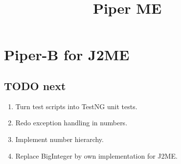 

\newtheorem{atheorem}{Theorem}[section]
\newtheorem{adefinition}{Definition}[section]
\newtheorem{analgo}{Algorithm}[section]
\newtheorem{anexample}{Example}[section]

\newtheorem{acorollary}[atheorem]{Korollar}
\newtheorem{asubtheo}[atheorem]{Lemma}
\newtheorem{atinytheo}[atheorem]{Proposition}
\newcommand{\Path}{{\rm Path}}
\newcommand{\LO}{{\rm LO}}
\newcommand{\Abl}{\mbox{\rm Abl}}
\newcommand{\LAST}{{\rm fin}}
\newcommand{\DIST}{\mbox{\rm DIST}}
\newcommand{\Root}{{\rm root}}
\newcommand{\Front}{\mbox{\rm front}}
\newcommand{\KOST}{{\cal C}}
\newcommand{\Choose}{{\rm Choose}}
\newcommand{\Eword}{\Box}
\newcommand{\Pbegin}{{\rm\bf begin }}
\newcommand{\Pprocedure}{{\rm\bf procedure }}
\newcommand{\Pfunction}{{\rm\bf function }}
\newcommand{\Pinteger}{{\rm\bf integer}}
\newcommand{\Pend}{{\rm\bf end }}
\newcommand{\Pfor}{{\rm\bf for }}
\newcommand{\Pforall}{{\rm\bf for all }}
\newcommand{\Pendfor}{{\rm\bf endfor }}
\newcommand{\Pto}{{\rm\bf to }}
\newcommand{\Pdownto}{{\rm\bf downto }}
\newcommand{\Pdo}{{\rm\bf do }}
\newcommand{\Pif}{{\rm\bf if }}
\newcommand{\Pthen}{{\rm\bf then }}
\newcommand{\Pendif}{{\rm\bf endif }}
\newcommand{\Pelse}{{\rm\bf else }}
\newcommand{\Pendelse}{{\rm\bf endelse }}
\newcommand{\Preturn}{{\rm\bf return }}
\newcommand{\Real}{{\rm{I\hspace*{-0.4ex}R}}}
\newcommand{\Nat}{{\rm{I\hspace*{-0.4ex}N}}}
\newcommand{\Bool}{{\rm{I\hspace*{-0.4ex}B}}}
\newcommand{\Uint}{{\rm{I\hspace*{-0.5ex}I}}}
\newcommand{\Zet}{{\rm\sf Z\hspace*{-1.0ex}Z}}
\newcommand{\QuestEq}{\stackrel{?}{=}}
\newcommand{\DefEq}{:=}
\newcommand{\DisUnion}{\stackrel{.}{\cup}}
\newcommand{\IsPref}{\le_{\mbox{\tiny pr"af}}}


\title{
{\LARGE Piper ME}\\
}

\maketitle


\chapter{Piper-B for J2ME}

\section{TODO next}
\begin{enumerate}
\item Turn test scripts into TestNG unit tests.
\item Redo exception handling in numbers.
\item Implement number hierarchy.
\item Replace BigInteger by own implementation for J2ME.
\end{enumerate}


